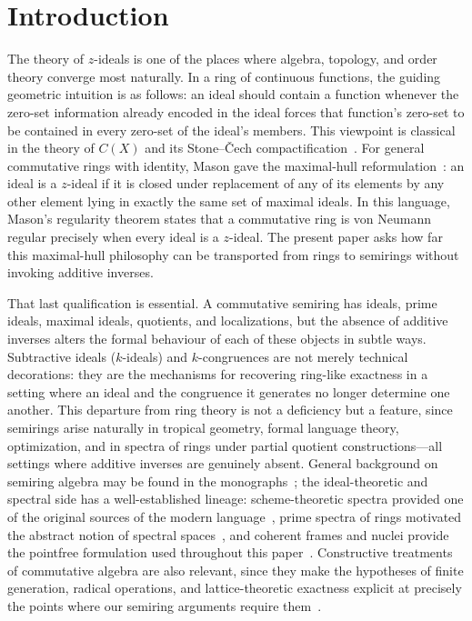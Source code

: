 \documentclass[11pt,leqno]{amsart}
\theoremstyle{plain}
\theoremstyle{definition}
\theoremstyle{remark}
\numberwithin{equation}{section}
\begin{document}
\maketitle

\setcounter{tocdepth}{1}
\tableofcontents

\section{Introduction}

The theory of $z$-ideals is one of the places where algebra,
topology, and order theory converge most naturally.
In a ring of continuous functions, the guiding geometric intuition
is as follows: an ideal should contain a function whenever the
zero-set information already encoded in the ideal forces that
function's zero-set to be contained in every zero-set of the ideal's
members.
This viewpoint is classical in the theory of $C(X)$ and its
Stone--\v{C}ech compactification~\cite[Chapter~2]{GillmanBook}.
For general commutative rings with identity, Mason gave the maximal-hull
reformulation~\cite{Mason71/z-ideals/prime-ideals,Mason2}:
an ideal is a $z$-ideal if it is closed under replacement of any
of its elements by any other element lying in exactly the same set of
maximal ideals.
In this language, Mason's regularity theorem states that a commutative
ring is von Neumann regular precisely when every ideal is a $z$-ideal.
The present paper asks how far this maximal-hull philosophy can be
transported from rings to semirings without invoking additive inverses.

That last qualification is essential.
A commutative semiring has ideals, prime ideals, maximal ideals,
quotients, and localizations, but the absence of additive inverses
alters the formal behaviour of each of these objects in subtle ways.
Subtractive ideals ($k$-ideals) and $k$-congruences are not merely
technical decorations: they are the mechanisms for recovering
ring-like exactness in a setting where an ideal and the congruence
it generates no longer determine one another.
This departure from ring theory is not a deficiency but a feature,
since semirings arise naturally in tropical geometry,
formal language theory, optimization, and in spectra of rings
under partial quotient constructions---all settings where additive
inverses are genuinely absent.
General background on semiring algebra may be found in the
monographs~\cite{Hebisch,Golan/Book}; the ideal-theoretic and
spectral side has a well-established lineage:
scheme-theoretic spectra provided one of the original sources of
the modern language~\cite{Grothendieck}, prime spectra of rings
motivated the abstract notion of spectral spaces~\cite{Hochster},
and coherent frames and nuclei provide the pointfree formulation
used throughout this paper~\cite{Johnstone,Banaschewski88,spectral-book}.
Constructive treatments of commutative algebra are also relevant,
since they make the hypotheses of finite generation, radical operations,
and lattice-theoretic exactness explicit at precisely the points
where our semiring arguments require them~\cite{Lombardi/Book}.
\end{document}
